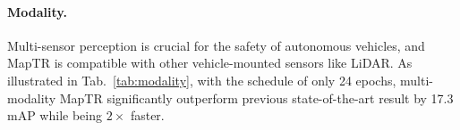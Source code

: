 \documentclass{article} \usepackage{iclr2023_conference,times}
\begin{document}
\begin{table}[h!]
\begin{center}
\end{center}
\vspace*{-0.45cm}
\caption{Ablations about Swin Transformer backbones.}
\label{tab:swin-backbones}
\vspace*{-0.35cm}
\end{table}


\paragraph{Modality.} Multi-sensor perception is crucial for the safety of autonomous vehicles, and MapTR is compatible with other vehicle-mounted sensors like LiDAR. As illustrated in Tab.~\ref{tab:modality}, with the schedule of only 24 epochs, multi-modality MapTR significantly outperform previous state-of-the-art result by 17.3 mAP while being $2\times$ faster.
\end{document}
